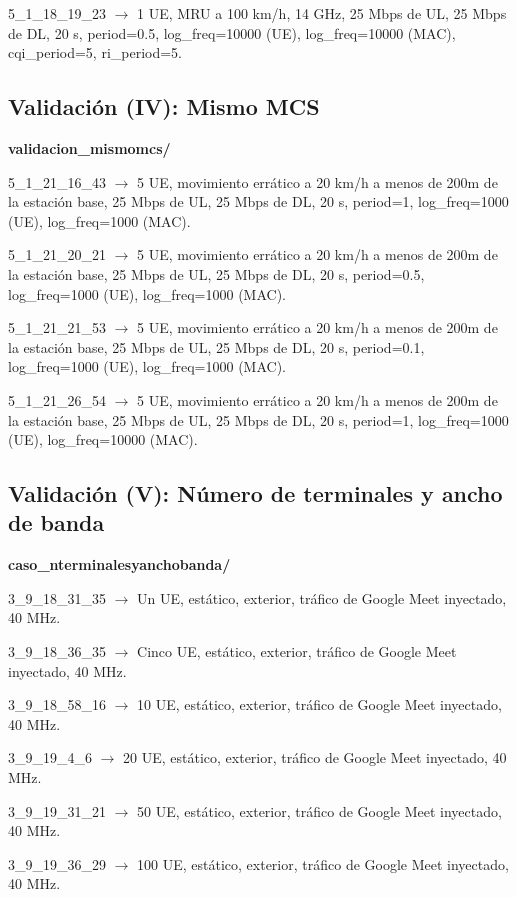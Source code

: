 \documentclass[12pt]{report} %
\begin{document}
5\_1\_18\_19\_23 $\rightarrow$ 1 UE, MRU a 100 km/h, 14 GHz, 25 Mbps de UL,  25 Mbps de DL, 20 s, period=0.5, log\_freq=10000 (UE), log\_freq=10000 (MAC), cqi\_period=5, ri\_period=5.

\subsection* {Validación (IV): Mismo MCS}

\textbf{validacion\_mismomcs/}

5\_1\_21\_16\_43 $\rightarrow$ 5 UE, movimiento errático a 20 km/h a menos de 200m de la estación base, 25 Mbps de UL, 25 Mbps de DL, 20 s, period=1, log\_freq=1000 (UE), log\_freq=1000 (MAC).

5\_1\_21\_20\_21 $\rightarrow$ 5 UE, movimiento errático a 20 km/h a menos de 200m de la estación base, 25 Mbps de UL, 25 Mbps de DL, 20 s, period=0.5, log\_freq=1000 (UE), log\_freq=1000 (MAC).

5\_1\_21\_21\_53 $\rightarrow$ 5 UE, movimiento errático a 20 km/h a menos de 200m de la estación base, 25 Mbps de UL, 25 Mbps de DL, 20 s, period=0.1, log\_freq=1000 (UE), log\_freq=1000 (MAC).

5\_1\_21\_26\_54 $\rightarrow$ 5 UE, movimiento errático a 20 km/h a menos de 200m de la estación base, 25 Mbps de UL, 25 Mbps de DL, 20 s, period=1, log\_freq=1000 (UE), log\_freq=10000 (MAC).

\subsection* {Validación (V): Número de terminales y ancho de banda}

\textbf{caso\_nterminalesyanchobanda/}

3\_9\_18\_31\_35 $\rightarrow$ Un UE, estático, exterior, tráfico de Google Meet inyectado, 40 MHz.

3\_9\_18\_36\_35 $\rightarrow$ Cinco UE, estático, exterior, tráfico de Google Meet inyectado, 40 MHz.

3\_9\_18\_58\_16 $\rightarrow$ 10 UE, estático, exterior, tráfico de Google Meet inyectado, 40 MHz.

3\_9\_19\_4\_6 $\rightarrow$ 20 UE, estático, exterior, tráfico de Google Meet inyectado, 40 MHz.

3\_9\_19\_31\_21 $\rightarrow$ 50 UE, estático, exterior, tráfico de Google Meet inyectado, 40 MHz.

3\_9\_19\_36\_29 $\rightarrow$ 100 UE, estático, exterior, tráfico de Google Meet inyectado, 40 MHz.
\end{document}
